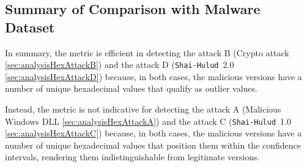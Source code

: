 \subsection*{Summary of Comparison with Malware Dataset}
\label{sec:analysisHexSummaryComparisonMalware}

In summary, the metric is efficient in detecting the attack B (Crypto attack \cref{sec:analysisHexAttackB}) 
and the attack D (\texttt{Shai-Hulud}~2.0 \cref{sec:analysisHexAttackD})
because, in both cases, the malicious versions have a number of unique hexadecimal values that 
qualify as outlier values.

Instead, the metric is not indicative for detecting the attack A (Malicious Windows DLL \cref{sec:analysisHexAttackA}) 
and the attack C (\texttt{Shai-Hulud}~1.0 \cref{sec:analysisHexAttackC}) because, in both cases, 
the malicious versions have a number of unique hexadecimal values that position them within the confidence intervals,
rendering them indistinguishable from legitimate versions.